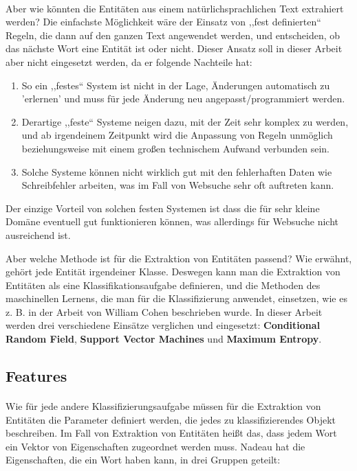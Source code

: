 \paragraph{}
Aber wie könnten die Entitäten aus einem natürlichsprachlichen Text extrahiert werden? Die einfachste Möglichkeit wäre der Einsatz von ,,fest definierten`` Regeln, die dann auf den ganzen Text angewendet werden, und entscheiden, ob das nächste Wort eine Entität ist oder nicht. Dieser Ansatz soll in dieser Arbeit aber nicht eingesetzt werden, da er folgende Nachteile\cite{baluja2000applying} hat:
\begin{enumerate}
\item So ein ,,festes`` System ist nicht in der Lage, Änderungen automatisch zu 'erlernen' und muss für jede Änderung neu angepasst/programmiert werden.
\item Derartige ,,feste`` Systeme neigen dazu, mit der Zeit sehr komplex zu werden, und ab irgendeinem Zeitpunkt wird die Anpassung von Regeln unmöglich beziehungsweise mit einem großen technischem Aufwand verbunden sein.
\item Solche Systeme können nicht wirklich gut mit den fehlerhaften Daten wie Schreibfehler arbeiten, was im Fall von Websuche sehr oft auftreten kann.
\end{enumerate}  
Der einzige Vorteil von solchen festen Systemen ist dass die für sehr kleine Domäne eventuell gut funktionieren können, was allerdings für Websuche nicht ausreichend ist.

Aber welche Methode ist für die Extraktion von Entitäten passend? Wie erwähnt, gehört jede Entität irgendeiner Klasse. Deswegen kann man die Extraktion von Entitäten als eine Klassifikationsaufgabe definieren, und die Methoden des maschinellen Lernens, die man für die Klassifizierung anwendet, einsetzen, wie es z. B. in der Arbeit von William Cohen\cite{cohen2004exploiting} beschrieben wurde. In dieser Arbeit werden drei verschiedene Einsätze verglichen und eingesetzt: \textbf{Conditional Random Field}, \textbf{Support Vector Machines} und \textbf{Maximum Entropy}.

\subsection{Features}
\paragraph{}
Wie für jede andere Klassifizierungsaufgabe müssen für die Extraktion von Entitäten die Parameter definiert werden, die jedes zu klassifizierendes Objekt beschreiben. Im Fall von Extraktion von Entitäten  heißt das, dass jedem Wort ein Vektor von Eigenschaften zugeordnet werden muss. Nadeau\cite{nadeau2007survey} hat die Eigenschaften, die ein Wort haben kann, in drei Gruppen geteilt:

